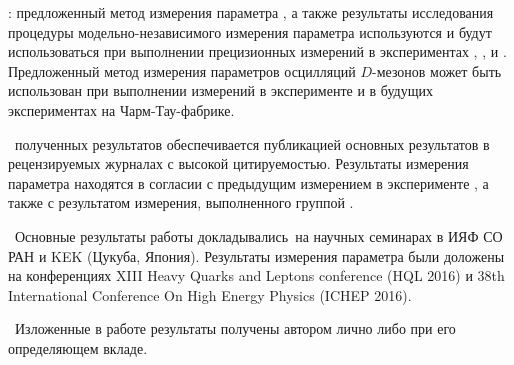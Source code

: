 \influence: предложенный метод измерения параметра \pphi, а также результаты исследования процедуры модельно-независимого измерения параметра \gphi используются и будут использоваться при выполнении прецизионных измерений в экспериментах \babar, \belle, \belleii и \lhcb.  Предложенный метод измерения параметров осцилляций $D$-мезонов может быть использован при выполнении измерений в эксперименте \besiii и в будущих экспериментах на Чарм-Тау-фабрике.

\reliability\ полученных результатов обеспечивается публикацией основных результатов в рецензируемых журналах с высокой цитируемостью. Результаты измерения параметра \pphi находятся в согласии с предыдущим измерением в эксперименте \belle, а также с результатом измерения, выполненного группой \babar.

\probation\ Основные результаты работы докладывались~на научных семинарах в ИЯФ СО РАН и KEK (Цукуба, Япония).  Результаты измерения параметра \pphi были доложены на конференциях XIII Heavy Quarks and Leptons conference (HQL 2016) и 38th International Conference On High Energy Physics (ICHEP 2016).

\contribution\ Изложенные в работе результаты получены автором лично либо при его определяющем вкладе.



